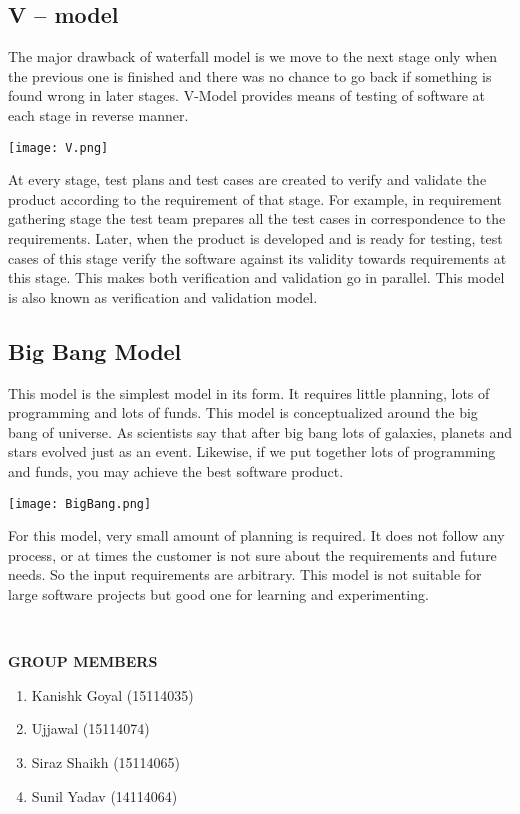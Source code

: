 \documentclass[11pt]{article}
\begin{document}
\subsection{V – model}
The major drawback of waterfall model is we move to the next stage only when the previous one is finished and there was no chance to go back if something is found wrong in later stages. V-Model provides means of testing of software at each stage in reverse manner.
 
\begin{center}
\texttt{[image: V.png]}
\end{center}

At every stage, test plans and test cases are created to verify and validate the product according to the requirement of that stage. For example, in requirement gathering stage the test team prepares all the test cases in correspondence to the requirements. Later, when the product is developed and is ready for testing, test cases of this stage verify the software against its validity towards requirements at this stage.
This makes both verification and validation go in parallel. This model is also known as verification and validation model.
\subsection{Big Bang Model}
This model is the simplest model in its form. It requires little planning, lots of programming and lots of funds. This model is conceptualized around the big bang of universe. As scientists say that after big bang lots of galaxies, planets and stars evolved just as an event. Likewise, if we put together lots of programming and funds, you may achieve the best software product.
 
\begin{center}
\texttt{[image: BigBang.png]}
\end{center}

For this model, very small amount of planning is required. It does not follow any process, or at times the customer is not sure about the requirements and future needs. So the input requirements are arbitrary.
This model is not suitable for large software projects but good one for learning and experimenting.

\
\
\
\
\
\
\
\
\begin{flushleft}


\begin{Large}
\textbf{GROUP MEMBERS}
\end{Large}
	\begin{enumerate}
\item Kanishk Goyal (15114035)
		
\item Ujjawal (15114074)
		
\item Siraz Shaikh (15114065)
		
\item Sunil Yadav (14114064)
	
		
	\end{enumerate}
	
\end{flushleft}

	
\end{document}
